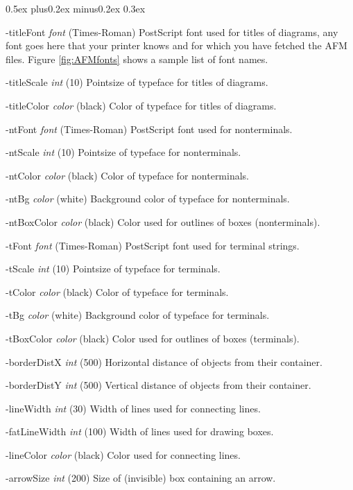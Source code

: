 \documentclass{article}
\newenvironment{bfscript}[1]{%
  \begin{list}{}{\settowidth{\labelwidth}{\bf #1}
      \setlength{\leftmargin}{\labelwidth}
      \addtolength{\leftmargin}{\labelsep}
      \parsep0.5ex plus0.2ex minus0.2ex \itemsep 0.3ex
      \renewcommand{\makelabel}[1]{\bf ##1\hfill}}}
  {\end{list}}
\newcommand{\new}{%
        {\ooalign {\hfil \raise .09ex
         \hbox {n}\hfil \crcr\mathhexbox 20D}}}
\begin{document}
\begin{bfscript}{\qquad}
\item[-titleFont     \emph{font}] (Times-Roman) PostScript font used for titles
  of diagrams, any font goes here that your printer knows and for which you have
  fetched the AFM files. Figure \ref{fig:AFMfonts} shows a sample list of font
  names. \new
\item[-titleScale     \emph{int}] (10) Pointsize of typeface for titles of diagrams.\new
\item[-titleColor   \emph{color}] (black) Color of typeface for titles of diagrams. \new
\item[-ntFont        \emph{font}] (Times-Roman) PostScript font used for nonterminals.
\item[-ntScale        \emph{int}] (10) Pointsize of typeface for nonterminals.
\item[-ntColor      \emph{color}] (black) Color of typeface for nonterminals.
\item[-ntBg         \emph{color}] (white) Background color of typeface for nonterminals.\new
\item[-ntBoxColor   \emph{color}] (black) Color used for outlines of boxes (nonterminals).\new
\item[-tFont         \emph{font}] (Times-Roman) PostScript font used for terminal strings.
\item[-tScale         \emph{int}] (10) Pointsize of typeface for terminals.
\item[-tColor       \emph{color}] (black) Color of typeface for terminals.
\item[-tBg          \emph{color}] (white) Background color of typeface for terminals.\new
\item[-tBoxColor    \emph{color}] (black) Color used for outlines of boxes (terminals).\new
\item[-borderDistX    \emph{int}] (500) Horizontal distance of objects from their container.
\item[-borderDistY    \emph{int}] (500) Vertical distance of objects from their container.
\item[-lineWidth      \emph{int}] (30) Width of lines used for connecting lines.
\item[-fatLineWidth   \emph{int}] (100) Width of lines used for drawing boxes.
\item[-lineColor    \emph{color}] (black) Color used for connecting lines.
\item[-arrowSize      \emph{int}] (200) Size of (invisible) box containing an arrow.

\end{bfscript}
\end{document}
